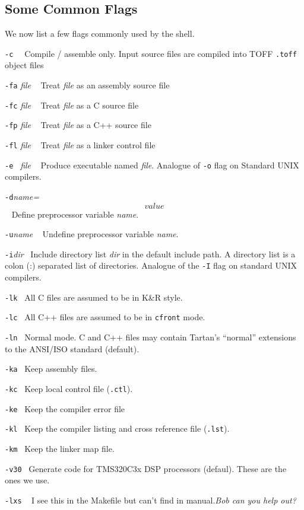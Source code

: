 \subsection{Some Common Flags}
We now list a few flags commonly used by the shell.
\begin{description}
\item{\tt -c \ } Compile / assemble only. Input source files are compiled
into TOFF {\tt .toff} object files
\item{{\tt -fa} {\em file} \ } Treat {\em file} as an assembly source file
\item{{\tt -fc} {\em file} \ } Treat {\em file} as a C source file
\item{{\tt -fp} {\em file} \ } Treat {\em file} as a C++ source file
\item{{\tt -fl} {\em file} \ } Treat {\em file} as a linker control file
\item{{\tt -e } {\em file} \ } Produce executable named {\em file}. Analogue 
of {\tt -o} flag on Standard UNIX compilers.
\item{{\tt -d}{\em name=\[value\]}\ } Define preprocessor variable {\em name}.
\item{{\tt -u}{\em name} \ } Undefine preprocessor variable {\em name}.
\item{{\tt -i}{\em dir}\ } Include directory list {\em dir} in the default
include path. A directory list is a colon (:) separated list of directories.
Analogue of the {\tt -I} flag on standard UNIX compilers.
\item{{\tt -lk}\ } All C files are assumed to be in K\&R style.
\item{{\tt -lc}\ } All C++ files are assumed to be in {\tt cfront} mode.
\item{{\tt -ln}\ } Normal mode. C and C++ files may contain Tartan's ``normal'' extensions to the ANSI/ISO standard (default).
\item{{\tt -ka}\ } Keep assembly files.
\item{{\tt -kc}\ } Keep local control file ({\tt .ctl}).
\item{{\tt -ke}\ } Keep the compiler error file 
\item{{\tt -kl}\ } Keep the compiler listing and cross reference file ({\tt .lst}).
\item{{\tt -km}\ } Keep the linker map file.
\item{{\tt -v30}\ } Generate code for TMS320C3x DSP processors (defaul). These are the ones we use.
\item{{\tt -lxs} \ } I see this in the Makefile but can't find in manual.{\em Bob can you help out?}

\end{description}
